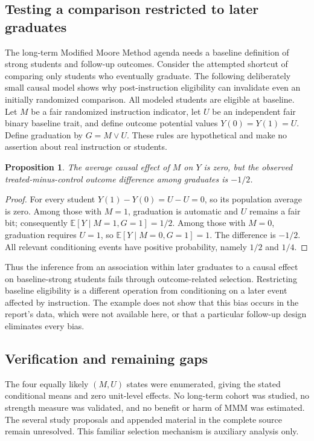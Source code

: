 \documentclass[11pt]{article}
\newtheorem{proposition}{Proposition}
\begin{document}
\subsection{Testing a comparison restricted to later graduates}
The long-term Modified Moore Method agenda needs a baseline definition of strong students and follow-up outcomes. Consider the attempted shortcut of comparing only students who eventually graduate. The following deliberately small causal model shows why post-instruction eligibility can invalidate even an initially randomized comparison.
All modeled students are eligible at baseline. Let $M$ be a fair randomized instruction indicator, let $U$ be an independent fair binary baseline trait, and define outcome potential values $Y(0)=Y(1)=U$. Define graduation by $G=M\lor U$. These rules are hypothetical and make no assertion about real instruction or students.
\begin{proposition}
The average causal effect of $M$ on $Y$ is zero, but the observed treated-minus-control outcome difference among graduates is $-1/2$.
\end{proposition}
\begin{proof}
For every student $Y(1)-Y(0)=U-U=0$, so its population average is zero. Among those with $M=1$, graduation is automatic and $U$ remains a fair bit; consequently $\mathbb E[Y\mid M=1,G=1]=1/2$. Among those with $M=0$, graduation requires $U=1$, so $\mathbb E[Y\mid M=0,G=1]=1$. The difference is $-1/2$. All relevant conditioning events have positive probability, namely $1/2$ and $1/4$.
\end{proof}
Thus the inference from an association within later graduates to a causal effect on baseline-strong students fails through outcome-related selection. Restricting baseline eligibility is a different operation from conditioning on a later event affected by instruction. The example does not show that this bias occurs in the report's data, which were not available here, or that a particular follow-up design eliminates every bias.
\subsection{Verification and remaining gaps}
The four equally likely $(M,U)$ states were enumerated, giving the stated conditional means and zero unit-level effects. No long-term cohort was studied, no strength measure was validated, and no benefit or harm of MMM was estimated. The several study proposals and appended material in the complete source remain unresolved. This familiar selection mechanism is auxiliary analysis only.
\end{document}
